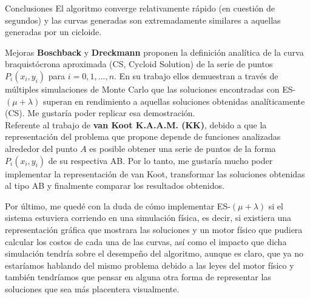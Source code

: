 \documentclass[10pt, letterpaper]{article}
\theoremstyle{definition}
\begin{document}
\begin{section}{Conclusiones}
    El algoritmo converge relativamente rápido (en cuestión de segundos) y las
    curvas generadas son extremadamente similares a aquellas generadas por
    un cicloide.

    \begin{subsection}{Mejoras}
        \textbf{Boschback} y \textbf{Dreckmann} proponen la definición analítica
        de la curva braquistócrona aproximada (CS, Cycloid Solution) de la serie
        de puntos $P_i(x_i, y_i)$ para $i={0, 1, ..., n}$. En su trabajo ellos
        demuestran a través de múltiples simulaciones de Monte Carlo que las
        soluciones encontradas con ES-$(\mu + \lambda)$ superan en rendimiento
        a aquellas soluciones obtenidas analíticamente (CS). Me gustaría poder
        replicar esa demostración.\\

        Referente al trabajo de \textbf{van Koot K.A.A.M. (KK)}, debido a que
        la representación del problema que propone depende de funciones
        analizadas alrededor del punto $A$ es posible obtener una serie de puntos
        de la forma $P_i(x_i, y_i)$ de su respectiva AB. Por lo tanto, me gustaría
        mucho poder implementar la representación de van Koot, transformar las
        soluciones obtenidas al tipo AB y finalmente comparar los resultados
        obtenidos.

        Por último, me quedé con la duda de cómo implementar ES-$(\mu + \lambda)$
        si el sistema estuviera corriendo en una simulación física, es decir,
        si existiera una representación gráfica que mostrara las soluciones
        y un motor físico que pudiera calcular los costos de cada una de las
        curvas, así como el impacto que dicha simulación tendría sobre el desempeño
        del algoritmo, aunque es claro, que ya no estaríamos hablando del mismo
        problema debido a las leyes del motor físico y también tendríamos que
        pensar en alguna otra forma de representar las soluciones que sea más
        placentera visualmente.
    \end{subsection}
\end{section}
\end{document}
